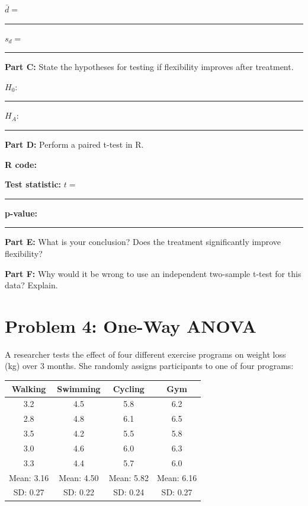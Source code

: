 \documentclass[11pt]{article}
\begin{document}
$\bar{d} = $ \rule{2cm}{0.4pt} \hspace{2cm} $s_d = $ \rule{2cm}{0.4pt}

\vspace{0.5cm}

\textbf{Part C:} State the hypotheses for testing if flexibility improves after treatment.

\vspace{0.3cm}

$H_0$: \rule{8cm}{0.4pt}

\vspace{0.5cm}

$H_A$: \rule{8cm}{0.4pt}

\vspace{0.5cm}

\textbf{Part D:} Perform a paired t-test in R.

\vspace{0.3cm}

\textbf{R code:}

\vspace{3cm}

\textbf{Test statistic:} $t = $ \rule{2cm}{0.4pt} \hspace{1cm} \textbf{p-value:} \rule{2cm}{0.4pt}

\vspace{0.5cm}

\textbf{Part E:} What is your conclusion? Does the treatment significantly improve flexibility?

\vspace{2.5cm}

\textbf{Part F:} Why would it be wrong to use an independent two-sample t-test for this data? Explain.

\vspace{3cm}

\newpage

\section{Problem 4: One-Way ANOVA}

A researcher tests the effect of four different exercise programs on weight loss (kg) over 3 months. She randomly assigns participants to one of four programs:

\vspace{0.3cm}

\begin{center}
\begin{tabular}{cccc}
\toprule
Walking & Swimming & Cycling & Gym \\
\midrule
3.2 & 4.5 & 5.8 & 6.2 \\
2.8 & 4.8 & 6.1 & 6.5 \\
3.5 & 4.2 & 5.5 & 5.8 \\
3.0 & 4.6 & 6.0 & 6.3 \\
3.3 & 4.4 & 5.7 & 6.0 \\
\midrule
Mean: 3.16 & Mean: 4.50 & Mean: 5.82 & Mean: 6.16 \\
SD: 0.27 & SD: 0.22 & SD: 0.24 & SD: 0.27 \\
\bottomrule
\end{tabular}
\end{center}
\end{document}
